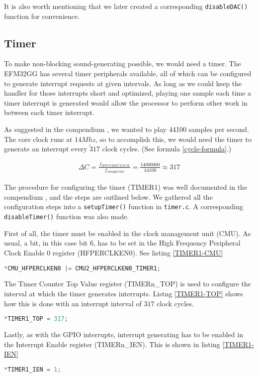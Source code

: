 It is also worth mentioning that we later created a corresponding \texttt{disableDAC()} function for convenience.

\subsection{Timer}

To make non-blocking sound-generating possible, we would need a timer. The EFM32GG has several timer peripherals available, all of which can be configured to generate interrupt requests at given intervals. As long as we could keep the handler for those interrupts short and optimized, playing one sample each time a timer interrupt is generated would allow the processor to perform other work in between each timer interrupt.

As suggested in the compendium \cite[p.~42]{compendium}, we wanted to play 44100 samples per second. The core clock runs at $14Mhz$, so to accomplish this, we would need the timer to generate an interrupt every $\tilde 317$ clock cycles. (See formula \ref{cycle-formula}.)

\begin{gather*}
\label{cycle-formula}
\Delta C = \frac{f_{HFCORECLOCK}}{f_{samplerate}} = \frac{14000000}{44100} \approx 317
\end{gather*}

The procedure for configuring the timer (TIMER1) was well documented in the compendium \cite[p.~40]{compendium}, and the steps are outlined below. We gathered all the configuration steps into a \texttt{setupTimer()} function in \texttt{timer.c}. A corresponding \texttt{disableTimer()} function was also made.

First of all, the timer must be enabled in the clock management unit (CMU). As usual, a bit, in this case bit 6, has to be set in the High Frequency Peripheral Clock Enable 0 register (HFPERCLKEN0). See listing \ref{TIMER1-CMU}

\begin{lstlisting}[language=C, label=TIMER1-CMU, caption=Enabling the timer in the CMU]
*CMU_HFPERCLKEN0 |= CMU2_HFPERCLKEN0_TIMER1;
\end{lstlisting}

The Timer Counter Top Value register (TIMERn\_TOP) is used to configure the interval at which the timer generates interrupts. Listng \ref{TIMER1-TOP} shows how this is done with an interrupt interval of $317$ clock cycles.

\begin{lstlisting}[language=C, label=TIMER1-TOP, caption=Setting interrupt interval]
*TIMER1_TOP = 317;
\end{lstlisting}

Lastly, as with the GPIO interrupts, interrupt generating has to be enabled in the Interrupt Enable register (TIMERn\_IEN). This is shown in listing \ref{TIMER1-IEN}

\begin{lstlisting}[language=C, label=TIMER1-IEN, caption=Interrupt generation]
*TIMER1_IEN = 1;
\end{lstlisting}
